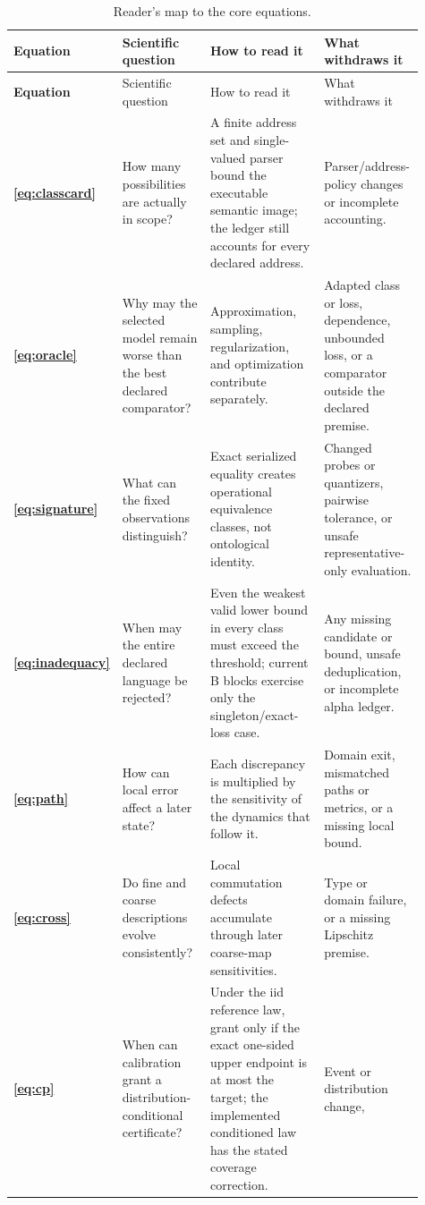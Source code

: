\documentclass[10pt]{article}
\theoremstyle{definition}
\begin{document}
\begingroup
\scriptsize
\setlength{\tabcolsep}{3.5pt}
\begin{longtable}{>{\bfseries}p{0.08\linewidth}p{0.24\linewidth}p{0.34\linewidth}p{0.25\linewidth}}
\caption{Reader's map to the core equations.}\label{tab:equation-map}\\
\toprule
Equation & Scientific question & How to read it & What withdraws it\\
\midrule
\endfirsthead
\toprule
Equation & Scientific question & How to read it & What withdraws it\\
\midrule
\endhead
\eqref{eq:classcard} & How many possibilities are actually in scope? & A finite address set and
single-valued parser bound the executable semantic image; the ledger still accounts for every
declared address. & Parser/address-policy changes or incomplete accounting.\\
\eqref{eq:oracle} & Why may the selected model remain worse than the best declared comparator? &
Approximation, sampling, regularization, and optimization contribute separately. & Adapted class
or loss, dependence, unbounded loss, or a comparator outside the declared premise.\\
\eqref{eq:signature} & What can the fixed observations distinguish? & Exact serialized equality
creates operational equivalence classes, not ontological identity. & Changed probes or quantizers,
pairwise tolerance, or unsafe representative-only evaluation.\\
\eqref{eq:inadequacy} & When may the entire declared language be rejected? & Even the weakest
valid lower bound in every class must exceed the threshold; current B blocks exercise only the
singleton/exact-loss case. & Any missing candidate or bound, unsafe deduplication, or incomplete
alpha ledger.\\
\eqref{eq:path} & How can local error affect a later state? & Each discrepancy is multiplied by the
sensitivity of the dynamics that follow it. & Domain exit, mismatched paths or metrics, or a
missing local bound.\\
\eqref{eq:cross} & Do fine and coarse descriptions evolve consistently? & Local commutation
defects accumulate through later coarse-map sensitivities. & Type or domain failure, or a missing
Lipschitz premise.\\
\eqref{eq:cp} & When can calibration grant a distribution-conditional certificate? & Under the
iid reference law, grant only if the exact one-sided upper endpoint is at most the target; the
implemented conditioned law has the stated coverage correction. & Event or distribution change,

\end{longtable}
\end{document}
